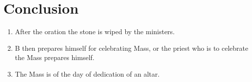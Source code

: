 \documentclass[twocolumn]{report}
\begin{document}
\section*{Conclusion}
\begin{enumerate}
	\item After the oration the stone is wiped by the ministers.
	\item B then prepares himself for celebrating Mass, or the priest who is to celebrate the Mass prepares himself.
	\item The Mass is of the day of dedication of an altar.
\end{enumerate}
\end{document}
